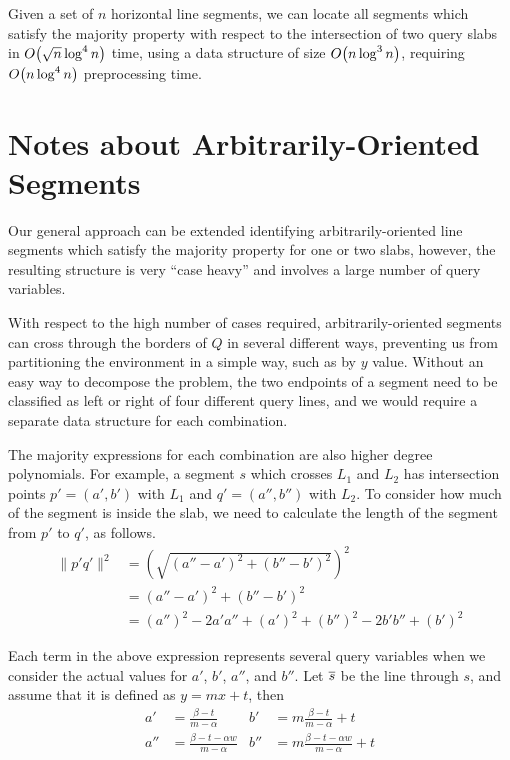 \begin{theorem}
\label{th:slabs:two}
Given a set of $n$ horizontal line segments, we can locate all segments which satisfy the majority property with respect to the intersection of two query slabs in $O\!\left(\sqrt{n}\log^4{n}\right)$ time, using a data structure of size $O\!\left(n\log^3{n}\right)$, requiring $O\!\left(n\log^4{n}\right)$ preprocessing time.
\end{theorem}


\section{Notes about Arbitrarily-Oriented Segments}
\label{:slabs:remarks}

Our general approach can be extended identifying arbitrarily-oriented line segments which satisfy the majority property for one or two slabs, however, the resulting structure is very ``case heavy'' and involves a large number of query variables.

With respect to the high number of cases required, arbitrarily-oriented segments can cross through the borders of $Q$ in several different ways, preventing us from partitioning the environment in a simple way, such as by $y$ value.
Without an easy way to decompose the problem, the two endpoints of a segment need to be classified as left or right of four different query lines, and we would require a separate data structure for each combination.

The majority expressions for each combination are also higher degree polynomials.
For example, a segment $s$ which crosses $L_1$ and $L_2$ has intersection points $p' = (a', b')$ with $L_1$ and $q' = (a'', b'')$ with $L_2$.  
To consider how much of the segment is inside the slab, we need to calculate the length of the segment from $p'$ to $q'$, as follows.
\[
\begin{split}
\|p'q'\|^2 
&= \left( \sqrt{(a'' - a')^2 + (b'' - b')^2} \right)^2 \\
%
&= (a'' - a')^2 + (b'' - b')^2 \\
%
&= (a'')^2 - 2a'a'' + (a')^2 + (b'')^2 - 2b'b'' + (b')^2
\end{split}
\]

Each term in the above expression represents several query variables when we consider the actual values for $a'$, $b'$, $a''$, and $b''$.  
Let $\overline{s}$ be the line through $s$, and assume that it is defined as $y = mx + t$, then
\begin{align*}
a'  &= \frac{\beta - t}{m - \alpha}
&b'  &= m \frac{\beta - t}{m - \alpha} + t \\
a'' &= \frac{\beta - t - \alpha w}{m - \alpha} 
&b'' &= m \frac{\beta - t - \alpha w}{m - \alpha} + t \\
\end{align*}

